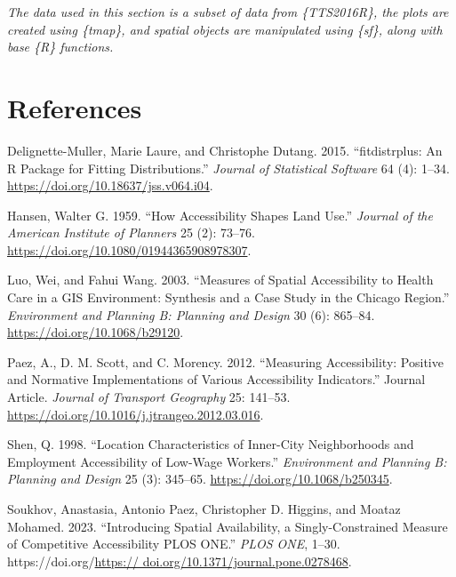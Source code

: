 \documentclass[12pt, oneside]{report}
\newlength{\cslhangindent}
\newlength{\cslentryspacingunit} %
\newenvironment{CSLReferences}[2] %
 {%
  \setlength{\parindent}{0pt}
  \ifodd #1
  \let\oldpar\par
  \def\par{\hangindent=\cslhangindent\oldpar}
  \fi
  \setlength{\parskip}{#2\cslentryspacingunit}
 }%
 {}
\begin{document}
\emph{The data used in this section is a subset of data from
\{TTS2016R\}, the plots are created using \{tmap\}, and spatial objects
are manipulated using \{sf\}, along with base \{R\} functions.}

\newpage

\hypertarget{references}{%
\section{References}\label{references}}

\hypertarget{refs}{}
\begin{CSLReferences}{1}{0}
\leavevmode{}%
Delignette-Muller, Marie Laure, and Christophe Dutang. 2015.
{``{fitdistrplus}: An {R} Package for Fitting Distributions.''}
\emph{Journal of Statistical Software} 64 (4): 1--34.
\url{https://doi.org/10.18637/jss.v064.i04}.

\leavevmode{}%
Hansen, Walter G. 1959. {``How Accessibility Shapes Land Use.''}
\emph{Journal of the American Institute of Planners} 25 (2): 73--76.
\url{https://doi.org/10.1080/01944365908978307}.

\leavevmode{}%
Luo, Wei, and Fahui Wang. 2003. {``Measures of Spatial Accessibility to
Health Care in a GIS Environment: Synthesis and a Case Study in the
Chicago Region.''} \emph{Environment and Planning B: Planning and
Design} 30 (6): 865--84. \url{https://doi.org/10.1068/b29120}.

\leavevmode{}%
Paez, A., D. M. Scott, and C. Morency. 2012. {``Measuring Accessibility:
Positive and Normative Implementations of Various Accessibility
Indicators.''} Journal Article. \emph{Journal of Transport Geography}
25: 141--53. \url{https://doi.org/10.1016/j.jtrangeo.2012.03.016}.

\leavevmode{}%
Shen, Q. 1998. {``Location Characteristics of Inner-City Neighborhoods
and Employment Accessibility of Low-Wage Workers.''} \emph{Environment
and Planning B: Planning and Design} 25 (3): 345--65.
\url{https://doi.org/10.1068/b250345}.

\leavevmode{}%
Soukhov, Anastasia, Antonio Paez, Christopher D. Higgins, and Moataz
Mohamed. 2023. {``Introducing Spatial Availability, a Singly-Constrained
Measure of Competitive Accessibility \textbar{} {PLOS ONE}.''}
\emph{PLOS ONE}, 1--30.
https://doi.org/\href{https://\%20doi.org/10.1371/journal.pone.0278468}{https://
doi.org/10.1371/journal.pone.0278468}.


\end{CSLReferences}
\end{document}
